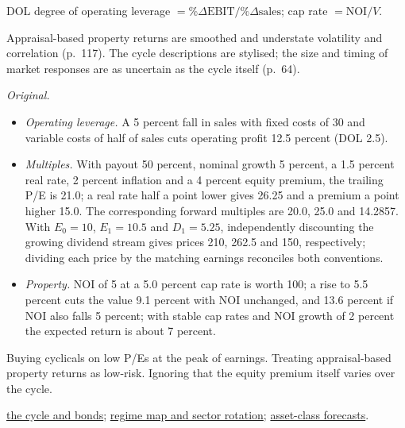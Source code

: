 \begin{qfmethod}
 DOL degree of operating leverage $=\%\Delta\text{EBIT}/\%\Delta\text{sales}$; cap rate $=\text{NOI}/V$.

 Appraisal-based property returns are smoothed and understate volatility and correlation (p.~117). The cycle descriptions are stylised; the size and timing of market responses are as uncertain as the cycle itself (p.~64).

 \emph{Original.}
\begin{itemize}
\item \emph{Operating leverage.} A 5 percent fall in sales with fixed costs of 30 and variable costs of half of sales cuts operating profit 12.5 percent (DOL 2.5).
\item \emph{Multiples.} With payout 50 percent, nominal growth 5 percent, a 1.5 percent real rate, 2 percent inflation and a 4 percent equity premium, the trailing P/E is 21.0; a real rate half a point lower gives 26.25 and a premium a point higher 15.0. The corresponding forward multiples are 20.0, 25.0 and 14.2857. With $E_0=10$, $E_1=10.5$ and $D_1=5.25$, independently discounting the growing dividend stream gives prices 210, 262.5 and 150, respectively; dividing each price by the matching earnings reconciles both conventions.
\item \emph{Property.} NOI of 5 at a 5.0 percent cap rate is worth 100; a rise to 5.5 percent cuts the value 9.1 percent with NOI unchanged, and 13.6 percent if NOI also falls 5 percent; with stable cap rates and NOI growth of 2 percent the expected return is about 7 percent.
\end{itemize}

 Buying cyclicals on low P/Es at the peak of earnings. Treating appraisal-based property returns as low-risk. Ignoring that the equity premium itself varies over the cycle.

 \hyperref[meth:cycle-rates-breakevens-spreads]{the cycle and bonds}; \hyperref[def:macro-regime-asset-map]{regime map and sector rotation}; \hyperref[meth:asset-class-return-forecasts]{asset-class forecasts}.

\end{qfmethod}
